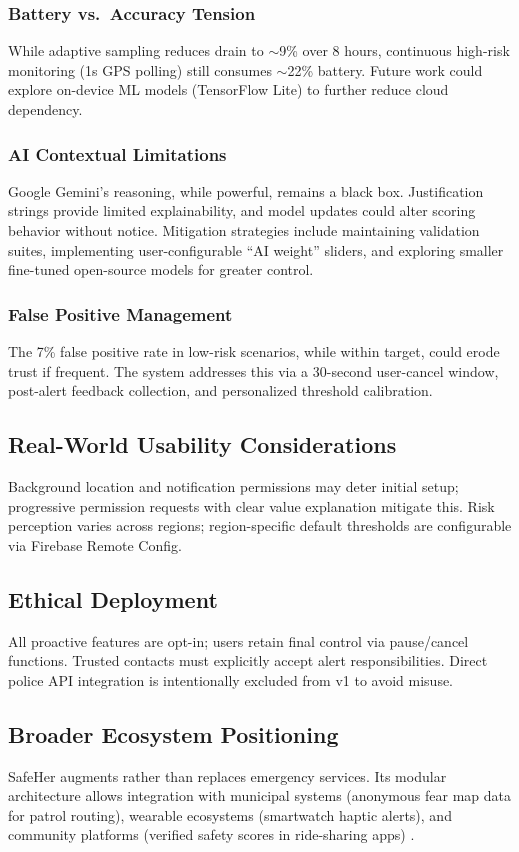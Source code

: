\subsubsection{Battery vs.\ Accuracy Tension}
While adaptive sampling reduces drain to $\sim$9\% over 8 hours, continuous high-risk monitoring (1s GPS polling) still consumes $\sim$22\% battery. Future work could explore on-device ML models (TensorFlow Lite) to further reduce cloud dependency.

\subsubsection{AI Contextual Limitations}
Google Gemini's reasoning, while powerful, remains a black box. Justification strings provide limited explainability, and model updates could alter scoring behavior without notice. Mitigation strategies include maintaining validation suites, implementing user-configurable ``AI weight'' sliders, and exploring smaller fine-tuned open-source models for greater control.

\subsubsection{False Positive Management}
The 7\% false positive rate in low-risk scenarios, while within target, could erode trust if frequent. The system addresses this via a 30-second user-cancel window, post-alert feedback collection, and personalized threshold calibration.

\subsection{Real-World Usability Considerations}
Background location and notification permissions may deter initial setup; progressive permission requests with clear value explanation mitigate this. Risk perception varies across regions; region-specific default thresholds are configurable via Firebase Remote Config.

\subsection{Ethical Deployment}
All proactive features are opt-in; users retain final control via pause/cancel functions. Trusted contacts must explicitly accept alert responsibilities. Direct police API integration is intentionally excluded from v1 to avoid misuse.

\subsection{Broader Ecosystem Positioning}
SafeHer augments rather than replaces emergency services. Its modular architecture allows integration with municipal systems (anonymous fear map data for patrol routing), wearable ecosystems (smartwatch haptic alerts), and community platforms (verified safety scores in ride-sharing apps) \cite{chen2024}.
